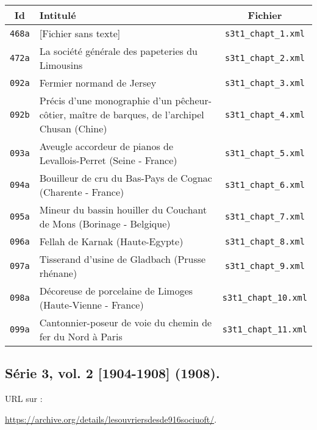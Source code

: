 \begin{center}
\begin{longtable}{ | c | p{9.5cm} | c | }
\hline
Id & Intitulé & Fichier \\ \hline
\texttt{468a} & [Fichier sans texte] & \texttt{s3t1\_chapt\_1.xml} \\ \hline
\texttt{472a} & La société générale des papeteries du Limousins & \texttt{s3t1\_chapt\_2.xml} \\ \hline
\texttt{092a} & Fermier normand de Jersey & \texttt{s3t1\_chapt\_3.xml} \\ \hline
\texttt{092b} & Précis d'une monographie d'un pêcheur-côtier, maître de barques, de l'archipel Chusan (Chine) & \texttt{s3t1\_chapt\_4.xml} \\ \hline
\texttt{093a} & Aveugle accordeur de pianos de Levallois-Perret (Seine - France) & \texttt{s3t1\_chapt\_5.xml} \\ \hline
\texttt{094a} & Bouilleur de cru du Bas-Pays de Cognac (Charente - France) & \texttt{s3t1\_chapt\_6.xml} \\ \hline
\texttt{095a} & Mineur du bassin houiller du Couchant de Mons (Borinage - Belgique) & \texttt{s3t1\_chapt\_7.xml} \\ \hline
\texttt{096a} & Fellah de Karnak (Haute-Egypte) & \texttt{s3t1\_chapt\_8.xml} \\ \hline
\texttt{097a} & Tisserand d'usine de Gladbach (Prusse rhénane) & \texttt{s3t1\_chapt\_9.xml} \\ \hline
\texttt{098a} & Décoreuse de porcelaine de Limoges (Haute-Vienne - France) & \texttt{s3t1\_chapt\_10.xml} \\ \hline
\texttt{099a} & Cantonnier-poseur de voie du chemin de fer du Nord à Paris & \texttt{s3t1\_chapt\_11.xml} \\ \hline
\end{longtable}
\end{center}

\subsection{Série 3, vol. 2 [1904-1908] (1908).}
\label{mappings3t2}

URL sur \ia{} : 

\url{https://archive.org/details/lesouvriersdesde916sociuoft/}.

